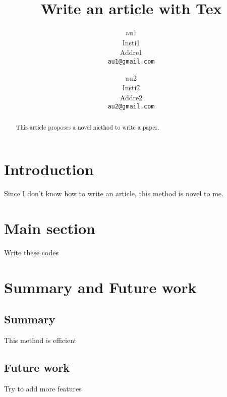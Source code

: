 \documentclass[10pt,twocolumn,letterpaper]{article}
\begin{document}
\title{Write an article with Tex}

\author{au1\\
Insti1\\
Addre1\\
{\tt\small au1@gmail.com}
\and
au2\\
Insti2\\
Addre2\\
{\tt\small au2@gmail.com}
}

\maketitle


\begin{abstract}
This article proposes a novel method to write a paper.
\end{abstract}

\section{Introduction}
Since I don't know how to write an article, this method is novel to me.\cite{DBLP:journals/corr/RajpurkarMKCTWN15}

\section{Main section}
Write these codes

\section{Summary and Future work}
\subsection{Summary}
This method is efficient
\subsection{Future work}
Try to add more features


\nocite{*}


\end{document}
